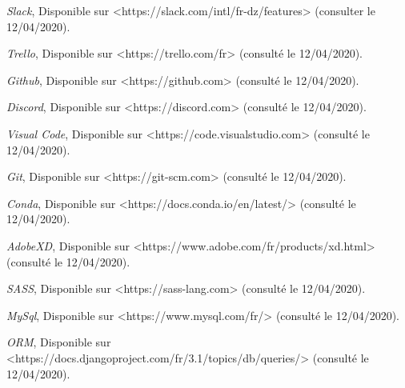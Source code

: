 \begin{thebibliography}{2}
        \emph{Slack}, Disponible sur <https://slack.com/intl/fr-dz/features> (consulter le 12/04/2020).
        
        \emph{Trello}, Disponible sur <https://trello.com/fr> (consulté le 12/04/2020).
        
        \emph{Github}, Disponible sur <https://github.com> (consulté le 12/04/2020).
        
        \emph{Discord}, Disponible sur <https://discord.com> (consulté le 12/04/2020).
        
        \emph{Visual Code}, Disponible sur <https://code.visualstudio.com> (consulté le 12/04/2020).
        
        \emph{Git}, Disponible sur <https://git-scm.com> (consulté le 12/04/2020).
        
        \emph{Conda}, Disponible sur <https://docs.conda.io/en/latest/> (consulté le 12/04/2020).
        
        \emph{AdobeXD}, Disponible sur <https://www.adobe.com/fr/products/xd.html> (consulté le 12/04/2020).
        
        \emph{SASS}, Disponible sur <https://sass-lang.com> (consulté le 12/04/2020).
        
        \emph{MySql}, Disponible sur <https://www.mysql.com/fr/> (consulté le 12/04/2020).
        
        \emph{ORM}, Disponible sur <https://docs.djangoproject.com/fr/3.1/topics/db/queries/> (consulté le 12/04/2020).

		
\end{thebibliography}